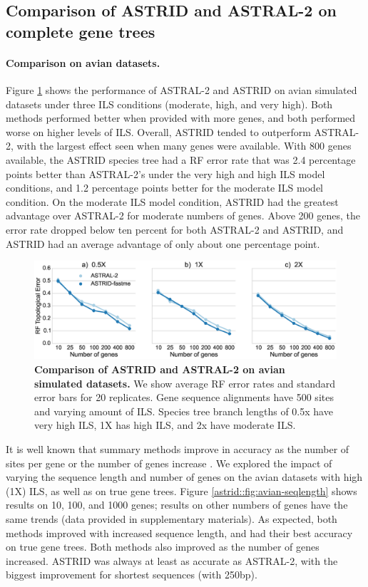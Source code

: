 \subsection{Comparison of ASTRID and ASTRAL-2 
on complete gene trees}

\paragraph{Comparison on avian datasets. }
Figure \ref{astrid::fig:avian-ils} shows the performance of
ASTRAL-2 
 and ASTRID on avian simulated datasets
under three ILS conditions (moderate, high, and very high).
Both methods performed better when provided with more genes, and both
performed worse on higher levels of ILS.
Overall, ASTRID tended to outperform ASTRAL-2, with the
largest effect seen when many genes were available. With 800 genes
available, the ASTRID species tree had a RF error
rate that was 2.4 percentage points better than ASTRAL-2’s under the
very high and high ILS model conditions, and 1.2 percentage points better for
the moderate ILS model condition.
On the moderate ILS model condition, ASTRID had the greatest advantage
over ASTRAL-2 
 for moderate numbers of genes. Above 200 genes, the error
rate dropped below ten percent for both ASTRAL-2 
 and ASTRID, and ASTRID
had an average advantage of only about one percentage point.


\begin{figure}
  \centering
  \includegraphics[width=12cm]{astrid-figs/avian-ils.eps}
  \caption[Comparison of ASTRID and ASTRAL-2 on avian simulated datasets]{\textbf{Comparison of ASTRID and ASTRAL-2 on avian simulated datasets. }
We show average RF error rates and standard error
bars for 20 replicates. Gene sequence alignments  have 500 sites
and
    varying amount of ILS. 
Species tree branch lengths of 0.5x 
    have very high ILS, 1X has high ILS, and 2x have moderate ILS. 
}
  \label{astrid::fig:avian-ils}
\end{figure}


It is well known that summary methods improve in accuracy as the
number of sites per gene or the number of genes increase
\cite{mirarab2014evaluating,GatesyMPE2014,bayzid2013naive,roch2015robustness}.  We
explored the impact of varying the sequence length and number of genes
on the avian datasets with high (1X) ILS, as well as on true gene
trees.  Figure \ref{astrid::fig:avian-seqlength} shows results on 10, 100, and
1000 genes; results on other numbers of genes have the same trends
(data provided in supplementary materials).
As expected, both methods improved
with increased sequence length, and had their best accuracy on
true gene trees.
Both methods also improved as the number of genes increased. 
ASTRID
was always at least as accurate as ASTRAL-2,
with the biggest improvement for shortest
sequences (with 250bp). 
 

